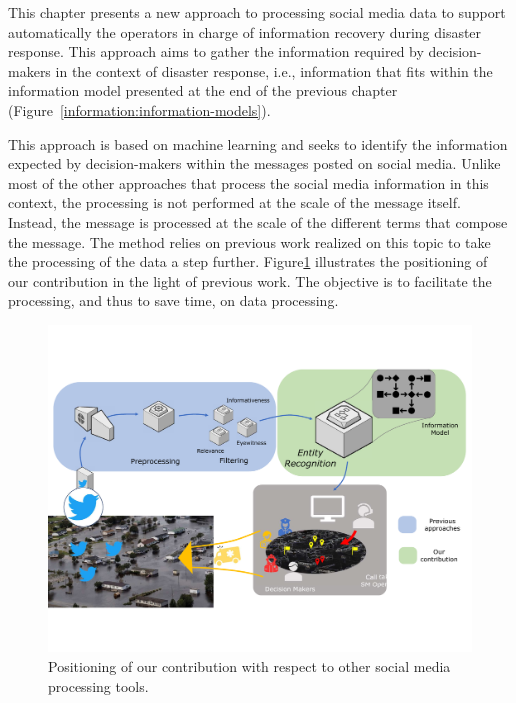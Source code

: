 This chapter presents a new approach to processing social media data to support automatically
the operators in charge of information recovery during disaster response.
This approach aims to gather the information required by decision-makers in the context
of disaster response, i.e., information that fits within the information model presented
at the end of the previous chapter (Figure~\ref{information:information-models}).

This approach is based on machine learning and seeks to identify the information expected
by decision-makers within the messages posted on social media.
Unlike most of the other approaches that process the social media information in this context, the processing is not performed at the scale of the message itself.
Instead, the message is processed at the scale of the different terms that compose the message.
The method relies on previous work realized on this topic to take the processing of the data a step further.
Figure\ref{processing:social-media-processing} illustrates the positioning of our contribution in the light of previous work.
The objective is to facilitate the processing, and thus to save time, on data processing.

\begin{figure}[htb]
    \centering
    \includegraphics[width=\textwidth]{figures/chap-4/social-media-processing.pdf}
    \caption{Positioning of our contribution with respect to other social media processing tools.}
    \label{processing:social-media-processing}
\end{figure}


